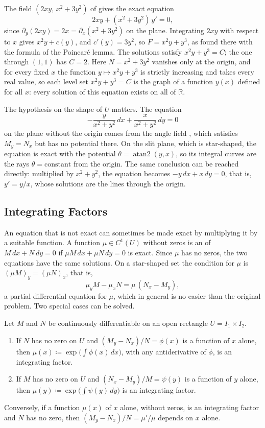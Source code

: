 The field $(2xy,\,x^2+3y^2)$ of  gives the exact equation
\[
2xy+(x^2+3y^2)\,y'=0 ,
\]
since $\partial_y(2xy)=2x=\partial_x(x^2+3y^2)$ on the plane. Integrating $2xy$ with respect to $x$ gives $x^2y+c(y)$, and $c'(y)=3y^2$, so $F=x^2y+y^3$, as found there with the formula of the Poincar\'e lemma. The solutions satisfy $x^2y+y^3=C$; the one through $(1,1)$ has $C=2$. Here $N=x^2+3y^2$ vanishes only at the origin, and for every fixed $x$ the function $y\mapsto x^2y+y^3$ is strictly increasing and takes every real value, so each level set $x^2y+y^3=C$ is the graph of a function $y(x)$ defined for all $x$: every solution of this equation exists on all of $\mathbb R$.

The hypothesis on the shape of $U$ matters. The equation
\[
-\frac y{x^2+y^2}\,dx+\frac x{x^2+y^2}\,dy=0
\]
on the plane without the origin comes from the angle field , which satisfies $M_y=N_x$ but has no potential there. On the slit plane, which is star-shaped, the equation is exact with the potential $\theta=\operatorname{atan2}(y,x)$, so its integral curves are the rays $\theta=\text{constant}$ from the origin. The same conclusion can be reached directly: multiplied by $x^2+y^2$, the equation becomes $-y\,dx+x\,dy=0$, that is, $y'=y/x$, whose solutions are the lines through the origin.

\subsection{Integrating Factors}

An equation that is not exact can sometimes be made exact by multiplying it by a suitable function. A function $\mu\in C^1(U)$ without zeros is an  of $M\,dx+N\,dy=0$ if $\mu M\,dx+\mu N\,dy=0$ is exact. Since $\mu$ has no zeros, the two equations have the same solutions. On a star-shaped set the condition for $\mu$ is $(\mu M)_y=(\mu N)_x$, that is,
\[
\mu_yM-\mu_xN=\mu\,(N_x-M_y),
\]
a partial differential equation for $\mu$, which in general is no easier than the original problem. Two special cases can be solved.

\begin{proposition}
\label{prop:integrating-factor}
Let $M$ and $N$ be continuously differentiable on an open rectangle $U=I_1\times I_2$.
\begin{enumerate}
\item If $N$ has no zero on $U$ and $(M_y-N_x)/N=\phi(x)$ is a function of $x$ alone, then $\mu(x)\coloneqq\exp\bigl(\int\phi(x)\,dx\bigr)$, with any antiderivative of $\phi$, is an integrating factor.
\item If $M$ has no zero on $U$ and $(N_x-M_y)/M=\psi(y)$ is a function of $y$ alone, then $\mu(y)\coloneqq\exp\bigl(\int\psi(y)\,dy\bigr)$ is an integrating factor.
\end{enumerate}
Conversely, if a function $\mu(x)$ of $x$ alone, without zeros, is an integrating factor and $N$ has no zero, then $(M_y-N_x)/N=\mu'/\mu$ depends on $x$ alone.
\end{proposition}

